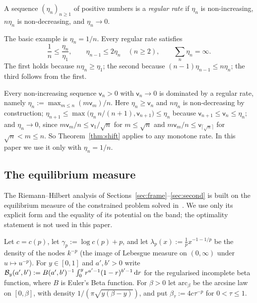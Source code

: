 \begin{definition}\label{def:regular}
A sequence $(\eta_n)_{n\ge1}$ of positive numbers is a \emph{regular rate} if $\eta_n$ is non-increasing, $n\eta_n$ is
non-decreasing, and $\eta_n\to0$.
\end{definition}

The basic example is $\eta_n=1/n$. Every regular rate satisfies
\begin{equation}\label{eq:regular-facts}
  \frac1n\le\frac{\eta_n}{\eta_1},\qquad \eta_{n-1}\le2\eta_n\quad(n\ge2),\qquad \sum_n\eta_n=\infty .
\end{equation}
The first holds because $n\eta_n\ge\eta_1$; the second because $(n-1)\eta_{n-1}\le n\eta_n$; the third follows from
the first.

\begin{remark}\label{rem:majorant}
Every non-increasing sequence $\mathsf v_n>0$ with $\mathsf v_n\to0$ is dominated by a regular rate, namely
$\eta_n:=\max_{m\le n}(m\mathsf v_m)/n$. Here $\eta_n\ge\mathsf v_n$ and $n\eta_n$ is non-decreasing by construction;
$\eta_{n+1}\le\max\bigl(\eta_n\,n/(n+1),\mathsf v_{n+1}\bigr)\le\eta_n$ because $\mathsf v_{n+1}\le\mathsf v_n\le\eta_n$;
and $\eta_n\to0$, since $m\mathsf v_m/n\le\mathsf v_1/\sqrt n$ for $m\le\sqrt n$ and $m\mathsf v_m/n\le\mathsf
v_{\lceil\sqrt n\rceil}$ for $\sqrt n<m\le n$. So Theorem~\ref{thm:shift} applies to any monotone rate. In this paper we
use it only with $\eta_n=1/n$.
\end{remark}

\subsection{The equilibrium measure}\label{sec:prelim-eq}

The Riemann--Hilbert analysis of Sections~\ref{sec:frame}--\ref{sec:second} is built on the equilibrium measure of the
constrained problem solved in~\cite{Paper1}. We use only its explicit form and the equality of its potential on the
band; the optimality statement \cite[Theorem~1.3(iii)]{Paper1} is not used in this paper.

Let $c=c(p)$, let $\gamma_p:=\log c(p)+p$, and let $\lambda_p(x):=\frac1px^{-1-1/p}$ be the density of the nodes
$k^{-p}$ (the image of Lebesgue measure on $(0,\infty)$ under $u\mapsto u^{-p}$). For $y\in[0,1]$ and $a',b'>0$ write
$\mathcal B_y(a',b'):=B(a',b')^{-1}\int_0^yr^{a'-1}(1-r)^{b'-1}\,\mathrm{d} r$ for the regularised incomplete beta function,
where $B$ is Euler's Beta function. For $\beta>0$ let $\mathrm{arc}_\beta$ be the arcsine law on $[0,\beta]$, with
density $1/(\pi\sqrt{y(\beta-y)})$, and put $\beta_\tau:=4c\tau^{-p}$ for $0<\tau\le1$.

